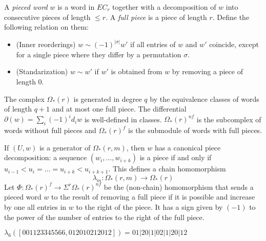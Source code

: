 A \emph{pieced word} $w$ is a word in $EC_r$ together with a decomposition of $w$ into consecutive pieces of length $\leq r$. A \emph{full piece} is a piece of length $r$. Define the following relation on them:
\begin{itemize}
	\item (Inner reorderings) $w\sim (-1)^{|\sigma|}w'$ if all entries of $w$ and $w'$ coincide, except for a single piece where they differ by a permutation $\sigma$.
	\item (Standarization) $w\sim w'$ if $w'$ is obtained from $w$ by removing a piece of length $0$.
\end{itemize}
The complex $\Omega_*(r)$ is generated in degree $q$ by the equivalence classes of words of length $q+1$ and at most one full piece.
The differential $\partial(w) = \sum_{i} (-1)^id_iw$ is well-defined in classes. $\Omega_*(r)^{nf}$ is the subcomplex of words without full pieces and $\Omega_*(r)^{f}$ is the submodule of words with full pieces.

If $(U,w)$ is a generator of $\Omega_*(r,m)$, then $w$ has a canonical piece decomposition: a sequence $(w_i,\ldots,w_{i+k})$ is a piece if and only if $u_{i-1}<u_i =\ldots= u_{i+k}<u_{i+k+1}$. This defines a chain homomorphism
\[\lambda_m\colon \Omega_*(r,m)\to \Omega_*(r)\]
Let $\Phi\colon \Omega_*(r)^f\to \Sigma^{r}\Omega_{*}(r)^{nf}$ be the (non-chain) homomorphism that sends a pieced word $w$ to the result of removing a full piece if it is possible and increase by one all entries in $w$ to the right of the piece. It has a sign given by $(-1)$ to the power of the number of entries to the right of the full piece.
\begin{example}\label{ex:106}
    $\lambda_6([001123345566,012010212012]) = 01|20|1|02|1|20|12$
\end{example}



